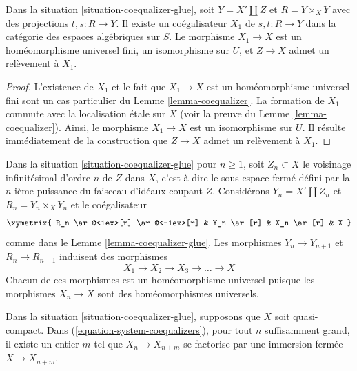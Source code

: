 \begin{lemma}
\label{lemma-coequalizer-glue}
Dans la situation \ref{situation-coequalizer-glue}, soit $Y = X' \amalg Z$ et
$R = Y \times_X Y$ avec des projections $t, s : R \to Y$. Il existe un
coégalisateur $X_1$ de $s, t : R \to Y$ dans la catégorie des espaces algébriques
sur $S$. Le morphisme $X_1 \to X$ est un homéomorphisme universel fini,
un isomorphisme sur $U$, et $Z \to X$ admet un relèvement à $X_1$.
\end{lemma}

\begin{proof}
L'existence de $X_1$ et le fait que $X_1 \to X$ est un homéomorphisme universel fini sont un cas particulier du Lemme \ref{lemma-coequalizer}.
La formation de $X_1$ commute avec la localisation \'etale sur $X$ (voir la preuve du Lemme \ref{lemma-coequalizer}).
Ainsi, le morphisme $X_1 \to X$ est un isomorphisme sur $U$.
Il résulte immédiatement de la construction que $Z \to X$ admet un relèvement à $X_1$.
\end{proof}

\noindent
Dans la situation \ref{situation-coequalizer-glue} pour $n \geq 1$, soit
$Z_n \subset X$ le voisinage infinitésimal d'ordre $n$ de $Z$ dans $X$, c'est-à-dire le sous-espace fermé défini par la $n$-ième puissance du faisceau d'idéaux coupant $Z$. Considérons $Y_n = X' \amalg Z_n$
et $R_n = Y_n \times_X Y_n$ et le coégalisateur
$$
\xymatrix{
R_n \ar@<1ex>[r] \ar@<-1ex>[r] & Y_n \ar[r] & X_n \ar[r] & X
}
$$
comme dans le Lemme \ref{lemma-coequalizer-glue}. Les morphismes $Y_n \to Y_{n + 1}$
et $R_n \to R_{n + 1}$ induisent des morphismes
\begin{equation}
\label{equation-system-coequalizers}
X_1 \to X_2 \to X_3 \to \ldots \to X
\end{equation}
Chacun de ces morphismes est un homéomorphisme universel puisque les morphismes
$X_n \to X$ sont des homéomorphismes universels.

\begin{lemma}
\label{lemma-essentially-constant}
Dans la situation \ref{situation-coequalizer-glue}, supposons que $X$ soit quasi-compact.
Dans (\ref{equation-system-coequalizers}), pour tout $n$ suffisamment grand, il existe un entier $m$ tel que $X_n \to X_{n + m}$ se factorise par une immersion fermée $X \to X_{n + m}$.
\end{lemma}

